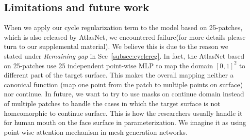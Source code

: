 \subsection{Limitations and future work}
When we apply our cycle regularization term to the model based on 25-patches, which is also released by AtlasNet\cite{atlasnet}, we encountered failure(for more details please turn to our supplemental material). We believe this is due to the reason we stated under \emph{Remaining gap} in Sec~\ref{subsec:cyclereg}. In fact, the AtlasNet based on 25-patches use 25 independent point-wise MLP to map the domain $[0,1]^2$ to different part of the target surface. This makes the overall mapping neither a canonical function (map one point from the patch to multiple points on surface) nor continue. In future, we want to try to use masks on continue domain instead of multiple patches to handle the cases in which the target surface is not homeomorphic to continue surface. This is how the researchers usually handle it for human mouth on the face surface in parameterization. We imagine it as using point-wise attention mechanism in mesh generation networks.